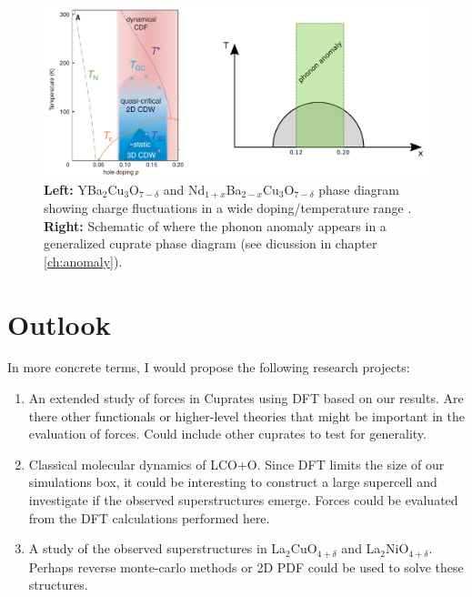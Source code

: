 \begin{figure}
    \centering
    \includegraphics[width=\textwidth]{fig/conclusion/cdw_summary.png}
    \caption{\textbf{Left:} YBa$_2$Cu$_3$O$_{7-\delta}$ and Nd$_{1+x}$Ba$_{2-x}$Cu$_3$O$_{7-\delta}$ phase diagram showing charge fluctuations in a wide doping/temperature range \cite{Arpaia2019}. \textbf{Right:} Schematic of where the phonon anomaly appears in a generalized cuprate phase diagram (see dicussion in chapter \ref{ch:anomaly}).}
    \label{fig:cdw_summary}
\end{figure}

\section{Outlook}
In more concrete terms, I would propose the following research projects:

\begin{enumerate}
    \item An extended study of forces in Cuprates using DFT based on our results. Are there other functionals or higher-level theories that might be important in the evaluation of forces. Could include other cuprates to test for generality.
    \item Classical molecular dynamics of LCO+O. Since DFT limits the size of our simulations box, it could be interesting to construct a large supercell and investigate if the observed superstructures emerge. Forces could be evaluated from the DFT calculations performed here.
    \item A study of the observed superstructures in La$_2$CuO$_{4+\delta}$ and La$_2$NiO$_{4+\delta}$. Perhaps reverse monte-carlo methods or 2D PDF could be used to solve these structures.
\end{enumerate}



